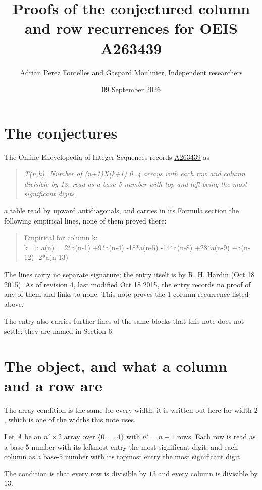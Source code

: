 \documentclass[11pt]{article}
\title{Proofs of the conjectured column and row recurrences for OEIS A263439}
\author{Adrian Perez Fontelles and Gaspard Moulinier, Independent researchers}
\date{09 September 2026}
\theoremstyle{definition}
\begin{document}
\maketitle
\section{The conjectures}

The Online Encyclopedia of Integer Sequences records \href{https://oeis.org/A263439}{A263439} as

\begin{quote}\itshape T(n,k)=Number of (n+1)X(k+1) 0..4 arrays with each row and column divisible by 13, read as a base-5 number with top and left being the most significant digits\end{quote}

a table read by upward antidiagonals, and carries in its Formula section the following empirical lines, none of them proved there:

\begin{quote}\ttfamily Empirical for column k:\\
k=1: a(n) = 2*a(n-1) +9*a(n-4) -18*a(n-5) -14*a(n-8) +28*a(n-9) +a(n-12) -2*a(n-13)\end{quote}

The lines carry no separate signature; the entry itself is by R. H. Hardin (Oct 18 2015). As of revision 4, last modified Oct 18 2015, the entry records no proof of any of them and links to none. This note proves the 1 column recurrence listed above.

The entry also carries further lines of the same blocks that this note does not settle; they are named in Section 6.

\section{The object, and what a column and a row are}

The array condition is the same for every width; it is written out here for width $2$, which is one of the widths this note uses.

Let $A$ be an $n' \times 2$ array over $\{0,\dots,4\}$ with $n' = n + 1$ rows. Each row is read as a base-$5$ number with its leftmost entry the most significant digit, and each column as a base-$5$ number with its topmost entry the most significant digit.

The condition is that every row is divisible by $13$ and every column is divisible by $13$.
\end{document}
